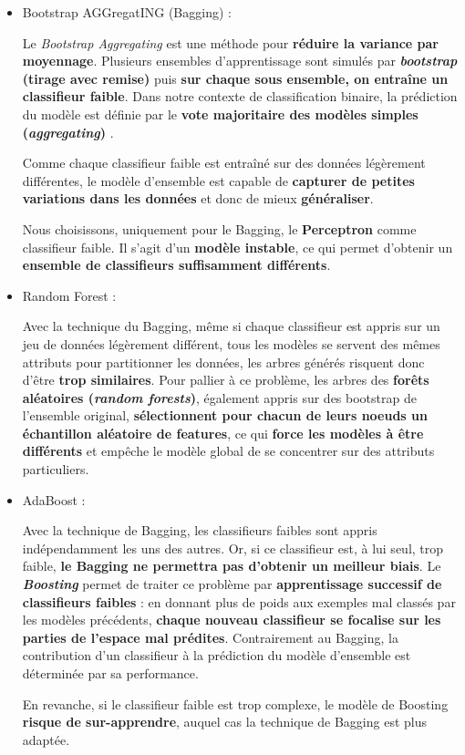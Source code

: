 \documentclass[12pt]{article}
\begin{document}
\begin{itemize}
    \item Bootstrap AGGregatING (Bagging) : 
        
        Le \emph{Bootstrap Aggregating} est une méthode pour \textbf{réduire la
        variance par moyennage}.  Plusieurs ensembles d'apprentissage sont
        simulés par \textbf{\emph{bootstrap} (tirage avec remise)} puis
        \textbf{sur chaque sous ensemble, on entraîne un classifieur faible}.
        Dans notre contexte de classification binaire, la prédiction du modèle
        est définie par le \textbf{vote majoritaire des modèles simples
        (\emph{aggregating})} .

Comme chaque classifieur faible est entraîné sur des données légèrement
différentes, le modèle d'ensemble est capable de \textbf{capturer de petites
variations dans les données} et donc de mieux \textbf{généraliser}. 

Nous choisissons, uniquement pour le Bagging, le \textbf{Perceptron} comme
classifieur faible. Il s'agit d'un \textbf{modèle instable}, ce qui permet
d'obtenir un \textbf{ensemble de classifieurs suffisamment différents}. \\

\item Random Forest : 
    
    Avec la technique du Bagging, même si chaque classifieur est appris sur un
        jeu de données légèrement différent, tous les modèles se servent des
        mêmes attributs pour partitionner les données, les arbres générés
        risquent donc d'être \textbf{trop similaires}. Pour pallier à ce
        problème, les arbres des \textbf{forêts aléatoires (\emph{random
        forests})}, également appris sur des bootstrap de l'ensemble original,
        \textbf{sélectionnent pour chacun de leurs noeuds un échantillon
        aléatoire de features}, ce qui \textbf{force les modèles à être
        différents} et empêche le modèle global de se concentrer sur des
        attributs particuliers. \\

    \item AdaBoost : 
        
        Avec la technique de Bagging, les classifieurs faibles sont appris
        indépendamment les uns des autres. Or, si ce classifieur est, à lui
        seul, trop faible, \textbf{le Bagging ne permettra pas d'obtenir un
        meilleur biais}. Le \textbf{\emph{Boosting}} permet de traiter ce
        problème par \textbf{apprentissage successif de classifieurs faibles} :
        en donnant plus de poids aux exemples mal classés par les modèles
        précédents, \textbf{chaque nouveau classifieur se focalise sur les
        parties de l'espace mal prédites}.  Contrairement au Bagging, la
        contribution d'un classifieur à la prédiction du modèle d'ensemble est
        déterminée par sa performance.

En revanche, si le classifieur faible est trop complexe, le modèle de Boosting
        \textbf{risque de sur-apprendre}, auquel cas la technique de Bagging est
        plus adaptée.

\end{itemize}
\end{document}
